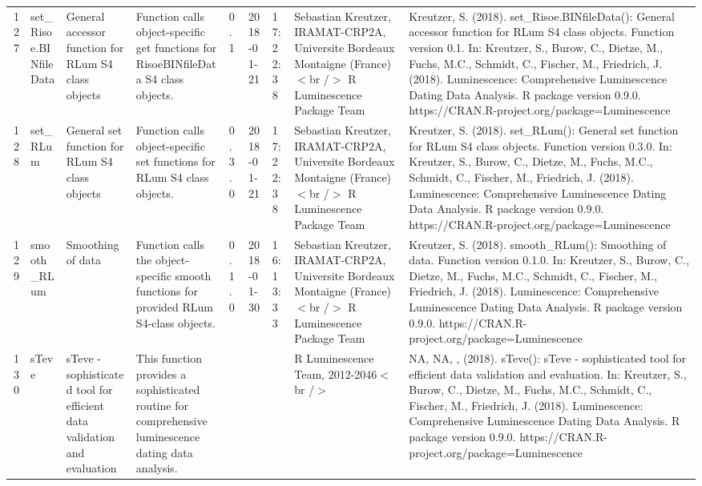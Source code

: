 \begin{table}[ht]
\begin{tabular}{rllllllll}
 \\ 
  127 & set\_Risoe.BINfileData & General accessor function for RLum S4 class objects & Function calls object-specific get functions for RisoeBINfileData S4 class objects. & 0.1 & 2018-01-21 & 17:22:38
 & Sebastian Kreutzer, IRAMAT-CRP2A, Universite Bordeaux Montaigne (France)$<$br /$>$  R Luminescence Package Team & Kreutzer, S. (2018). set\_Risoe.BINfileData(): General accessor function for RLum S4 class objects. Function version 0.1. In: Kreutzer, S., Burow, C., Dietze, M., Fuchs, M.C., Schmidt, C., Fischer, M., Friedrich, J. (2018). Luminescence: Comprehensive Luminescence Dating Data Analysis. R package version 0.9.0. https://CRAN.R-project.org/package=Luminescence
 \\ 
  128 & set\_RLum & General set function for RLum S4 class objects & Function calls object-specific set functions for RLum S4 class objects. & 0.3.0 & 2018-01-21 & 17:22:38
 & Sebastian Kreutzer, IRAMAT-CRP2A, Universite Bordeaux Montaigne (France)$<$br /$>$  R Luminescence Package Team & Kreutzer, S. (2018). set\_RLum(): General set function for RLum S4 class objects. Function version 0.3.0. In: Kreutzer, S., Burow, C., Dietze, M., Fuchs, M.C., Schmidt, C., Fischer, M., Friedrich, J. (2018). Luminescence: Comprehensive Luminescence Dating Data Analysis. R package version 0.9.0. https://CRAN.R-project.org/package=Luminescence
 \\ 
  129 & smooth\_RLum & Smoothing of data & Function calls the object-specific smooth functions for provided RLum S4-class objects. & 0.1.0 & 2018-01-30 & 16:13:33
 & Sebastian Kreutzer, IRAMAT-CRP2A, Universite Bordeaux Montaigne (France)$<$br /$>$  R Luminescence Package Team & Kreutzer, S. (2018). smooth\_RLum(): Smoothing of data. Function version 0.1.0. In: Kreutzer, S., Burow, C., Dietze, M., Fuchs, M.C., Schmidt, C., Fischer, M., Friedrich, J. (2018). Luminescence: Comprehensive Luminescence Dating Data Analysis. R package version 0.9.0. https://CRAN.R-project.org/package=Luminescence
 \\ 
  130 & sTeve & sTeve - sophisticated tool for efficient data validation and evaluation & This function provides a sophisticated routine for comprehensive luminescence dating data analysis. &  &  &  & R Luminescence Team, 2012-2046$<$br /$>$ & NA, NA, ,  (2018). sTeve(): sTeve - sophisticated tool for efficient data validation and evaluation. In: Kreutzer, S., Burow, C., Dietze, M., Fuchs, M.C., Schmidt, C., Fischer, M., Friedrich, J. (2018). Luminescence: Comprehensive Luminescence Dating Data Analysis. R package version 0.9.0. https://CRAN.R-project.org/package=Luminescence

\end{tabular}
\end{table}
